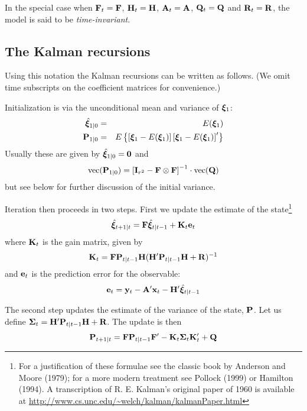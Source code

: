 \documentclass[a4paper]{article}
\newcommand{\obsvec}{\ensuremath\mathbf{y}}
\newcommand{\obsmat}{\ensuremath\mathbf{H}}
\newcommand{\obsx}{\ensuremath\mathbf{x}}
\newcommand{\obsxmat}{\ensuremath\mathbf{A}}
\newcommand{\obsvar}{\ensuremath\mathbf{R}}
\newcommand{\statevec}{\ensuremath\mathbf{\bm \xi}}
\newcommand{\statemat}{\ensuremath\mathbf{F}}
\newcommand{\strvar}{\ensuremath\mathbf{Q}}
\newcommand{\statevar}{\ensuremath\mathbf{P}}
\newcommand{\gain}{\ensuremath\mathbf{K}}
\newcommand{\prederr}{\ensuremath\mathbf{e}}
\newcommand{\predvar}{\ensuremath{\bm\Sigma}}
\newcommand{\myvec}{\mbox{vec}}
\begin{document}
In the special case when $\statemat_t = \statemat$, $\obsmat_t = \obsmat$,
$\obsxmat_t = \obsxmat$, $\strvar_t = \strvar$ and $\obsvar_t =
\obsvar$, the model is said to be \emph{time-invariant}.

\subsection{The Kalman recursions}

Using this notation the Kalman recursions can be written as follows.
(We omit time subscripts on the coefficient matrices for convenience.)

Initialization is via the unconditional mean and variance of
$\statevec_1$:
%
\begin{eqnarray*}
\hat{\statevec}_{1|0} &=& E(\statevec_1) \\
\statevar_{1|0} &=& E\left\{\left[\statevec_1 - E(\statevec_1)\right]
   \left[\statevec_1 - E(\statevec_1)\right]' \right\}
\end{eqnarray*}
Usually these are given by $\hat{\statevec}_{1|0} = \mathbf{0}$ and
\begin{equation}
\label{eq:inivar}
\myvec(\statevar_{1|0}) = \left[\mathbf{I}_{r^2} - \statemat \otimes
  \statemat\right]^{-1} \cdot \myvec(\strvar)
\end{equation}
but see below for further discussion of the initial variance.

Iteration then proceeds in two steps.  First we update the estimate of
the state\footnote{For a justification of these formulae see the
  classic book by Anderson and Moore (1979); for a more modern
  treatment see Pollock (1999) or Hamilton (1994).  A transcription of
  R. E. Kalman's original paper of 1960 is available at
  \url{http://www.cs.unc.edu/~welch/kalman/kalmanPaper.html}}
%
\begin{equation}
\hat{\statevec}_{t+1|t} = \statemat\hat{\statevec}_{t|t-1} + 
  \gain_t \prederr_t
\end{equation}
%
where $\gain_t$ is the gain matrix, given by
%
\begin{equation}
\label{eq:gain}
\gain_t = \statemat\statevar_{t|t-1}\obsmat
  (\obsmat'\statevar_{t|t-1}\obsmat + \obsvar)^{-1}
\end{equation}
%
and $\prederr_t$ is the prediction error for the observable:
\[
\prederr_t = \obsvec_t - \obsxmat'\obsx_t - \obsmat' \hat{\statevec}_{t|t-1}
\]

The second step updates the estimate of the variance of the state,
$\statevar$.  Let us define $\predvar_t =
\obsmat'\statevar_{t|t-1}\obsmat + \obsvar$.  The update is then
\begin{equation}
\statevar_{t+1|t} = \statemat\statevar_{t|t-1}\statemat' -
 \gain_t \predvar_t \gain_t' + \strvar
\end{equation}
\end{document}
